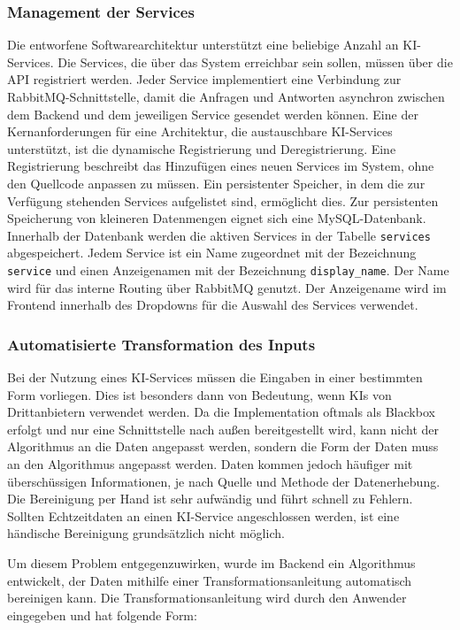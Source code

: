 \subsubsection{Management der Services}
Die entworfene Softwarearchitektur unterstützt eine beliebige Anzahl an KI-Services. Die Services, die über das System erreichbar sein sollen, müssen über die API registriert werden. Jeder Service implementiert eine Verbindung zur RabbitMQ-Schnittstelle, damit die Anfragen und Antworten asynchron zwischen dem Backend und dem jeweiligen Service gesendet werden können. Eine der Kernanforderungen für eine Architektur, die austauschbare KI-Services unterstützt, ist die dynamische Registrierung und Deregistrierung. Eine Registrierung beschreibt das Hinzufügen eines neuen Services im System, ohne den Quellcode anpassen zu müssen. Ein persistenter Speicher, in dem die zur Verfügung stehenden Services aufgelistet sind, ermöglicht dies. Zur persistenten Speicherung von kleineren Datenmengen eignet sich eine MySQL-Datenbank. Innerhalb der Datenbank werden die aktiven Services in der Tabelle \texttt{services} abgespeichert. Jedem Service ist ein Name zugeordnet mit der Bezeichnung \texttt{service} und einen Anzeigenamen mit der Bezeichnung \texttt{display\_{}name}. Der Name wird für das interne Routing über RabbitMQ genutzt. Der Anzeigename wird im Frontend innerhalb des Dropdowns für die Auswahl des Services verwendet.

\subsubsection{Automatisierte Transformation des Inputs}
Bei der Nutzung eines KI-Services müssen die Eingaben in einer bestimmten Form vorliegen. Dies ist besonders dann von Bedeutung, wenn KIs von Drittanbietern verwendet werden. Da die Implementation oftmals als Blackbox erfolgt und nur eine Schnittstelle nach außen bereitgestellt wird, kann nicht der Algorithmus an die Daten angepasst werden, sondern die Form der Daten muss an den Algorithmus angepasst werden. Daten kommen jedoch häufiger mit überschüssigen Informationen, je nach Quelle und Methode der Datenerhebung. Die Bereinigung per Hand ist sehr aufwändig und führt schnell zu Fehlern. Sollten Echtzeitdaten an einen KI-Service angeschlossen werden, ist eine händische Bereinigung grundsätzlich nicht möglich.

Um diesem Problem entgegenzuwirken, wurde im Backend ein Algorithmus entwickelt, der Daten mithilfe einer Transformationsanleitung automatisch bereinigen kann. Die Transformationsanleitung wird durch den Anwender eingegeben und hat folgende Form:


